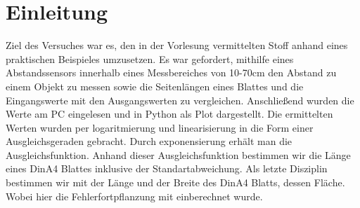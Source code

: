 \documentclass[TGAI_Laborbericht.tex]{subfiles}
\begin{document}
\chapter{Einleitung}
\label{chap:EINL}
\pagestyle{plain}
Ziel des Versuches war es, den in der Vorlesung vermittelten Stoff anhand eines praktischen
Beispieles umzusetzen. Es war gefordert, mithilfe eines Abstandssensors innerhalb eines
Messbereiches von 10-70cm den Abstand zu einem Objekt zu messen sowie die
Seitenlängen eines Blattes und die Eingangswerte mit den Ausgangswerten zu vergleichen.
Anschließend wurden die Werte am PC eingelesen und in Python als Plot dargestellt. Die
ermittelten Werten wurden per logaritmierung und linearisierung in die Form einer
Ausgleichsgeraden gebracht. Durch exponensierung erhält man die Ausgleichsfunktion.
Anhand dieser Ausgleichsfunktion bestimmen wir die Länge eines DinA4 Blattes inklusive
der Standartabweichung. Als letzte Disziplin bestimmen wir mit der Länge und der Breite
des DinA4 Blatts, dessen Fläche. Wobei hier die Fehlerfortpflanzung mit einberechnet
wurde.
\end{document}
